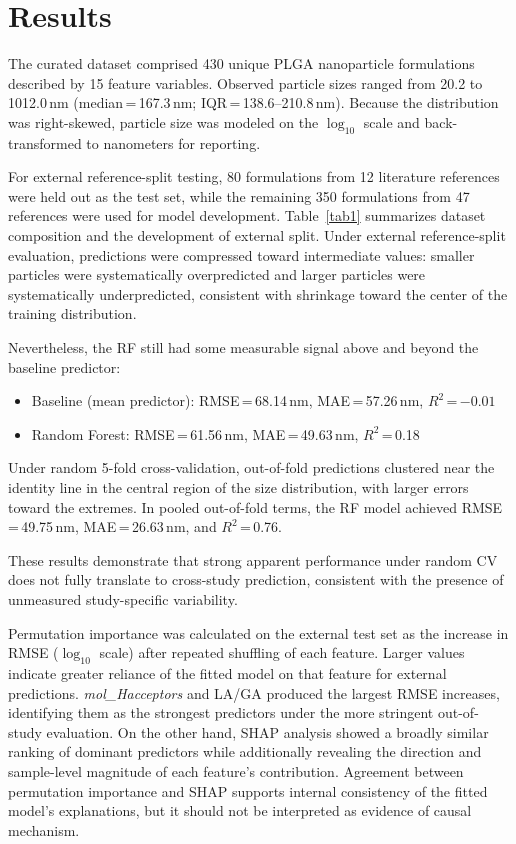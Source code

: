 \documentclass[10pt]{NSP1}
\begin{document}
\section{Results}

The curated dataset comprised 430 unique PLGA nanoparticle formulations described by 15 feature
variables. Observed particle sizes ranged from 20.2 to 1012.0\,nm (median\,=\,167.3\,nm;
IQR\,=\,138.6--210.8\,nm). Because the distribution was right-skewed, particle size was modeled
on the $\log_{10}$ scale and back-transformed to nanometers for reporting.

For external reference-split testing, 80 formulations from 12 literature references were held out
as the test set, while the remaining 350 formulations from 47 references were used for model
development. Table~\ref{tab1} summarizes dataset composition and the development of external split.
Under external reference-split evaluation, predictions were compressed toward intermediate values:
smaller particles were systematically overpredicted and larger particles were systematically
underpredicted, consistent with shrinkage toward the center of the training distribution.

Nevertheless, the RF still had some measurable signal above and beyond the baseline predictor:
\begin{itemize}
\item Baseline (mean predictor): RMSE\,=\,68.14\,nm, MAE\,=\,57.26\,nm, $R^2$\,=\,$-0.01$
\item Random Forest: RMSE\,=\,61.56\,nm, MAE\,=\,49.63\,nm, $R^2$\,=\,0.18
\end{itemize}



Under random 5-fold cross-validation, out-of-fold predictions clustered near the identity line in
the central region of the size distribution, with larger errors toward the extremes. In pooled out-of-fold terms, the RF model achieved
RMSE\,=\,49.75\,nm, MAE\,=\,26.63\,nm, and $R^2$\,=\,0.76.

These results demonstrate that strong apparent performance under random CV does not fully translate
to cross-study prediction, consistent with the presence of unmeasured study-specific variability.



Permutation importance was calculated on the external test set as the increase in RMSE
($\log_{10}$ scale) after repeated shuffling of each feature. Larger values indicate greater
reliance of the fitted model on that feature for external predictions. \textit{mol\_Hacceptors}
and LA/GA produced the largest RMSE increases, identifying them as the strongest predictors under
the more stringent out-of-study evaluation. On the other hand,
SHAP analysis showed a broadly similar ranking of dominant predictors while additionally revealing
the direction and sample-level magnitude of each feature's contribution.  Agreement between permutation importance and SHAP supports internal
consistency of the fitted model's explanations, but it should not be interpreted as evidence of
causal mechanism.
\end{document}
